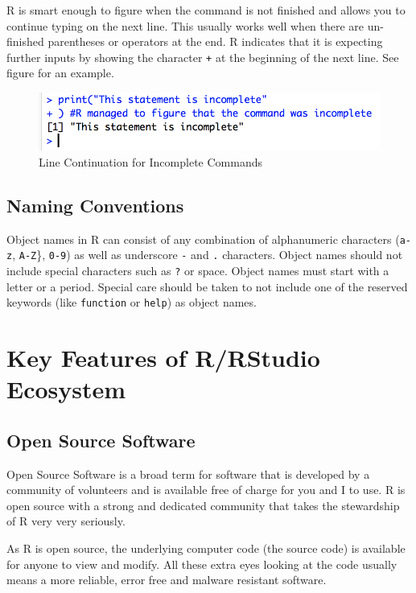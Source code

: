 \documentclass[]{krantz}
\begin{document}
R is smart enough to figure when the command is not finished and allows
you to continue typing on the next line. This usually works well when
there are un-finished parentheses or operators at the end. R indicates
that it is expecting further inputs by showing the character \texttt{+}
at the beginning of the next line. See figure for an example.

\begin{figure}

{\centering \includegraphics[width=0.5\linewidth]{images/incomplete} 

}

\caption{Line Continuation for Incomplete Commands}\label{fig:unnamed-chunk-10}
\end{figure}

\subsection{Naming Conventions}\label{naming-conventions}

Object names in R can consist of any combination of alphanumeric
characters (\texttt{a-z}, \texttt{A-Z}\}, \texttt{0-9}) as well as
underscore \texttt{-} and \texttt{.} characters. Object names should not
include special characters such as \texttt{?} or space. Object names
must start with a letter or a period. Special care should be taken to
not include one of the reserved keywords (like \texttt{function} or
\texttt{help}) as object names.

\section{Key Features of R/RStudio
Ecosystem}\label{key-features-of-rrstudio-ecosystem}

\subsection{Open Source Software}\label{open-source-software}

Open Source Software is a broad term for software that is developed by a
community of volunteers and is available free of charge for you and I to
use. R is open source with a strong and dedicated community that takes
the stewardship of R very very seriously.

As R is open source, the underlying computer code (the source code) is
available for anyone to view and modify. All these extra eyes looking at
the code usually means a more reliable, error free and malware resistant
software.
\end{document}

